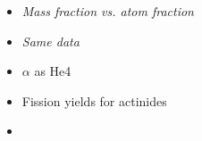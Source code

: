 \begin{itemize}
\item \it{Mass fraction vs. atom fraction}
\item {\it Same data}
\item $\alpha$ as He4
\item Fission yields for actinides
\item {}
\end{itemize}
